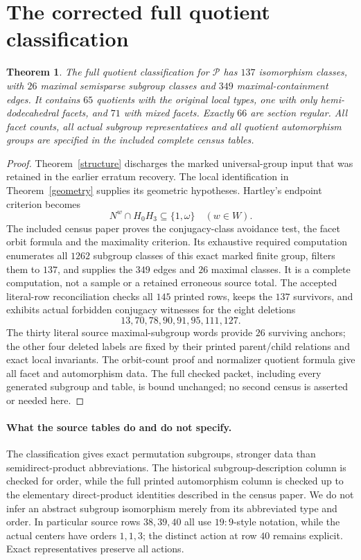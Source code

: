 \documentclass[11pt,a4paper]{article}
\newtheorem{theorem}{Theorem}\newtheorem{lemma}[theorem]{Lemma}
\begin{document}
\section{The corrected full quotient classification}
\begin{theorem}\label{census}
The full quotient classification for $\mathcal P$ has $137$ isomorphism classes, with $26$ maximal semisparse subgroup classes and $349$ maximal-containment edges. It contains $65$ quotients with the original local types, one with only hemi-dodecahedral facets, and $71$ with mixed facets. Exactly $66$ are section regular. All facet counts, all actual subgroup representatives and all quotient automorphism groups are specified in the included complete census tables.
\end{theorem}
\begin{proof}
Theorem~\ref{structure} discharges the marked universal-group input that was retained in the earlier erratum recovery. The local identification in Theorem~\ref{geometry} supplies its geometric hypotheses. Hartley's endpoint criterion becomes
\[
 N^w\cap H_0H_3\subseteq\{1,\omega\}\quad(w\in W).
\]
The included census paper proves the conjugacy-class avoidance test, the facet orbit formula and the maximality criterion. Its exhaustive required computation enumerates all $1262$ subgroup classes of this exact marked finite group, filters them to $137$, and supplies the $349$ edges and $26$ maximal classes. It is a complete computation, not a sample or a retained erroneous source total. The accepted literal-row reconciliation checks all $145$ printed rows, keeps the $137$ survivors, and exhibits actual forbidden conjugacy witnesses for the eight deletions
\[
 13,70,78,90,91,95,111,127.
\]
The thirty literal source maximal-subgroup words provide $26$ surviving anchors; the other four deleted labels are fixed by their printed parent/child relations and exact local invariants. The orbit-count proof and normalizer quotient formula give all facet and automorphism data. The full checked packet, including every generated subgroup and table, is bound unchanged; no second census is asserted or needed here.
\end{proof}

\paragraph{What the source tables do and do not specify.}
The classification gives exact permutation subgroups, stronger data than semidirect-product abbreviations. The historical subgroup-description column is checked for order, while the full printed automorphism column is checked up to the elementary direct-product identities described in the census paper. We do not infer an abstract subgroup isomorphism merely from its abbreviated type and order. In particular source rows $38,39,40$ all use $19:9$-style notation, while the actual centers have orders $1,1,3$; the distinct action at row $40$ remains explicit. Exact representatives preserve all actions.
\end{document}

